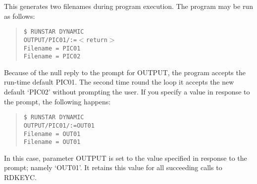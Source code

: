 \documentclass{article}
\begin{document}
This generates two filenames during program execution.
The program may be run as follows:
\begin{quote}
{\tt \$ RUNSTAR DYNAMIC\\
OUTPUT/PIC01/:=$<$return$>$\\
Filename = PIC01\\
Filename = PIC02}
\end{quote}
Because of the null reply to the prompt for OUTPUT, the program accepts the
run-time default PIC01.
The second time round the loop it accepts the new default `PIC02' without
prompting the user.
If you specify a value in response to the prompt, the following happens:
\begin{quote}
{\tt \$ RUNSTAR DYNAMIC\\
OUTPUT/PIC01/:=OUT01\\
Filename = OUT01\\
Filename = OUT01}
\end{quote}
In this case, parameter OUTPUT is set to the value specified in response to
the prompt; namely `OUT01'.
It retains this value for all succeeding calls to RDKEYC.
\end{document}
